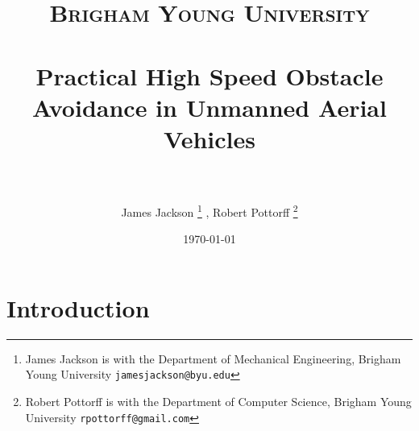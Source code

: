 \documentclass[paper=a4, fontsize=11pt]{scrartcl} %
\title{
\normalfont \normalsize
\textsc{Brigham Young University} \\ [25pt] %
\horrule{0.5pt} \\[0.4cm] %
\huge Practical High Speed Obstacle Avoidance in Unmanned Aerial Vehicles\\ %
\horrule{2pt} \\[0.5cm] %
}
\author{James Jackson%
\thanks{James Jackson is with the Department of Mechanical Engineering, Brigham Young University
        {\tt\small jamesjackson@byu.edu}}%
        , Robert Pottorff
\thanks{Robert Pottorff is with the Department of Computer Science, Brigham Young University
        {\tt\small rpottorff@gmail.com}}%
}
\date{\normalsize\today} %
\begin{document}
\maketitle %


\section{Introduction}
\end{document}
